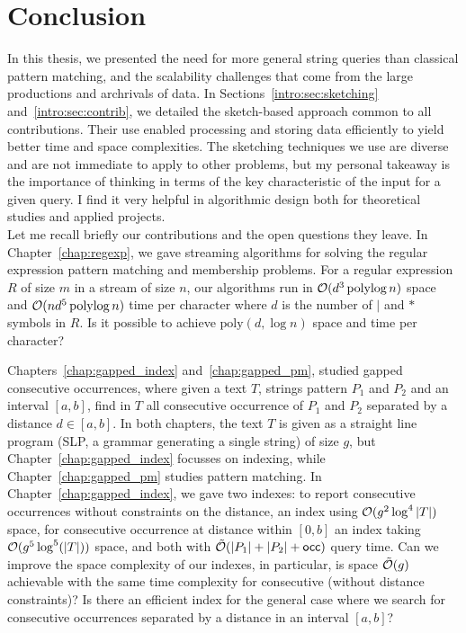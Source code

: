 \clearemptydoublepage
{}
\chapter*{Conclusion}
In this thesis, we presented the need for more general string queries than classical pattern matching, and the scalability challenges that come from the large productions and archrivals of data.
%
In Sections~\ref*{intro:sec:sketching} and~\ref*{intro:sec:contrib}, we detailed the sketch-based approach common to all contributions. Their use enabled processing and storing data efficiently to yield better time and space complexities.
%
The sketching techniques we use are diverse and are not immediate to apply to other problems, but my personal takeaway is the importance of thinking in terms of the key characteristic of the input for a given query. I find it very helpful in algorithmic design both for theoretical studies and applied projects.\\


Let me recall briefly our contributions and the open questions they leave. 
In Chapter~\ref{chap:regexp}, we gave streaming algorithms for solving the regular expression pattern matching and membership problems. For a regular expression $R$ of size $m$ in a stream of size $n$, our algorithms run in $\mathcal{O}(d^3 \operatorname{polylog} n)$ space and $\mathcal{O}(nd^5\operatorname{polylog} n)$ time per character where $d$ is the number of $|$ and $\ast$ symbols in $R$. Is it possible to achieve $\mathrm{poly}(d,\log n)$ space and time per character?

Chapters~\ref{chap:gapped_index} and~\ref{chap:gapped_pm}, studied gapped consecutive occurrences, where given a text $T$, strings pattern $P_1$ and $P_2$ and an interval $[a,b]$, find in $T$ all consecutive occurrence of $P_1$ and $P_2$ separated by a distance $d \in [a,b]$. In both chapters, the text $T$ is given as a straight line program (SLP, a grammar generating a single string) of size $g$, but Chapter~\ref{chap:gapped_index} focusses on indexing, while Chapter~\ref{chap:gapped_pm} studies pattern matching. In Chapter~\ref{chap:gapped_index}, we gave two indexes: to report consecutive occurrences without constraints on the distance, an index using $\mathcal{O}(g^2\log^4|T|)$ space, for consecutive occurrence at distance within $[0,b]$ an index taking $\mathcal{O} (g^5\log^5(|T|))$ space, and both with $\tilde{\mathcal{O}}(|P_1|+|P_2|+\mathsf{occ})$ query time. 
%
Can we improve the space complexity of our indexes, in particular, is space $\tilde{\mathcal{O}}(g)$ achievable with the same time complexity for consecutive (without distance constraints)? Is there an efficient index for the general case where we search for consecutive occurrences separated by a distance in an interval $[a,b]$?

